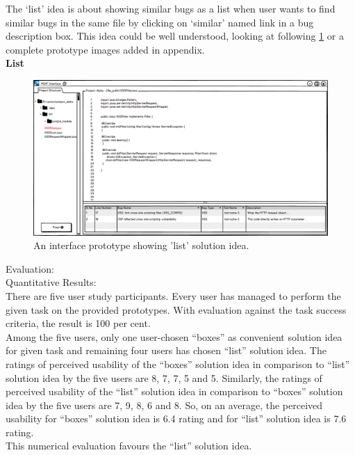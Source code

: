 The ‘list’ idea is about showing similar bugs as a list when user wants to find similar bugs in the same file by clicking on ‘similar’ named link in a bug description box. This idea could be well understood, looking at following \ref{fig:S31_similar_list} or a complete prototype images added in appendix. \\

\textbf{List}
\begin{figure}[hbt!]
	\centering
	\includegraphics[width=\linewidth]{figures/solution_ideas_snaps/S31_similar_list}
	\caption{An interface prototype showing 'list' solution idea.}
	\label{fig:S31_similar_list}
\end{figure} 

Evaluation: \\

Quantitative Results: \\

There are five user study participants. Every user has managed to perform the given task on the provided prototypes. With evaluation against the task success criteria, the result is 100 per cent. \\

Among the five users, only one user-chosen “boxes” as convenient solution idea for given task and remaining four users has chosen “list” solution idea. The ratings of perceived usability of the “boxes” solution idea in comparison to “list” solution idea by the five users are 8, 7, 7, 5 and 5. Similarly, the ratings of perceived usability of the “list” solution idea in comparison to “boxes” solution idea by the five users are 7, 9, 8, 6 and 8. So, on an average, the perceived usability for “boxes” solution idea is 6.4 rating and for “list” solution idea is 7.6 rating. \\

This numerical evaluation favours the “list” solution idea. \\


